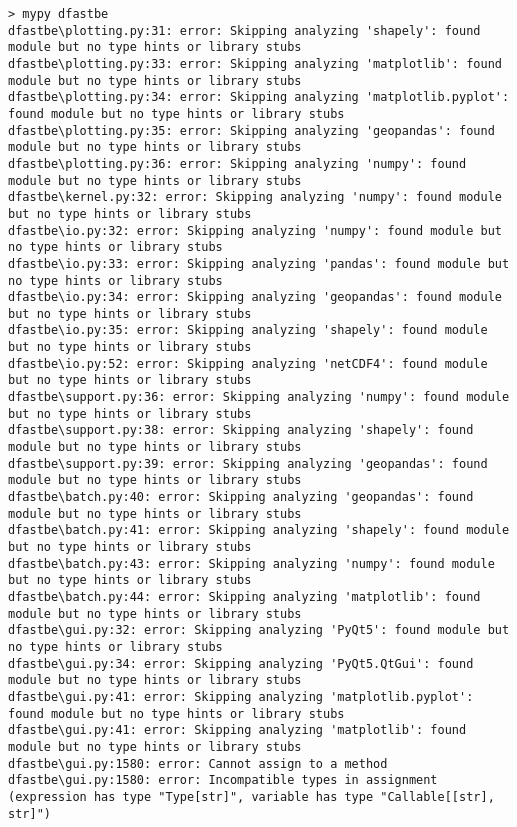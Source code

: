 \begin{Verbatim}[fontsize=\tiny]
> mypy dfastbe
dfastbe\plotting.py:31: error: Skipping analyzing 'shapely': found module but no type hints or library stubs
dfastbe\plotting.py:33: error: Skipping analyzing 'matplotlib': found module but no type hints or library stubs
dfastbe\plotting.py:34: error: Skipping analyzing 'matplotlib.pyplot': found module but no type hints or library stubs
dfastbe\plotting.py:35: error: Skipping analyzing 'geopandas': found module but no type hints or library stubs
dfastbe\plotting.py:36: error: Skipping analyzing 'numpy': found module but no type hints or library stubs
dfastbe\kernel.py:32: error: Skipping analyzing 'numpy': found module but no type hints or library stubs
dfastbe\io.py:32: error: Skipping analyzing 'numpy': found module but no type hints or library stubs
dfastbe\io.py:33: error: Skipping analyzing 'pandas': found module but no type hints or library stubs
dfastbe\io.py:34: error: Skipping analyzing 'geopandas': found module but no type hints or library stubs
dfastbe\io.py:35: error: Skipping analyzing 'shapely': found module but no type hints or library stubs
dfastbe\io.py:52: error: Skipping analyzing 'netCDF4': found module but no type hints or library stubs
dfastbe\support.py:36: error: Skipping analyzing 'numpy': found module but no type hints or library stubs
dfastbe\support.py:38: error: Skipping analyzing 'shapely': found module but no type hints or library stubs
dfastbe\support.py:39: error: Skipping analyzing 'geopandas': found module but no type hints or library stubs
dfastbe\batch.py:40: error: Skipping analyzing 'geopandas': found module but no type hints or library stubs
dfastbe\batch.py:41: error: Skipping analyzing 'shapely': found module but no type hints or library stubs
dfastbe\batch.py:43: error: Skipping analyzing 'numpy': found module but no type hints or library stubs
dfastbe\batch.py:44: error: Skipping analyzing 'matplotlib': found module but no type hints or library stubs
dfastbe\gui.py:32: error: Skipping analyzing 'PyQt5': found module but no type hints or library stubs
dfastbe\gui.py:34: error: Skipping analyzing 'PyQt5.QtGui': found module but no type hints or library stubs
dfastbe\gui.py:41: error: Skipping analyzing 'matplotlib.pyplot': found module but no type hints or library stubs
dfastbe\gui.py:41: error: Skipping analyzing 'matplotlib': found module but no type hints or library stubs
dfastbe\gui.py:1580: error: Cannot assign to a method
dfastbe\gui.py:1580: error: Incompatible types in assignment (expression has type "Type[str]", variable has type "Callable[[str], str]")

\end{Verbatim}
